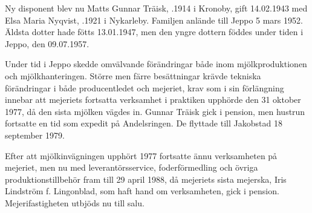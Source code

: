 Ny disponent blev nu Matts Gunnar Träisk, .1914 i Kronoby, gift 14.02.1943 med Elsa Maria Nyqvist, .1921 i Nykarleby. Familjen anlände till Jeppo 5 mars 1952. Äldsta dotter  hade fötts 13.01.1947, men den yngre dottern  föddes under tiden i Jeppo, den 09.07.1957.

Under  tid i Jeppo skedde omvälvande förändringar både inom mjölkproduktionen och mjölkhanteringen. Större men färre besättningar krävde tekniska förändringar i både producentledet och mejeriet, krav som i sin förlängning innebar att mejeriets fortsatta verksamhet i praktiken upphörde den 31 oktober 1977, då den sista mjölken vägdes in. Gunnar Träisk gick i pension, men hustrun  fortsatte en tid som expedit på Andelsringen. De flyttade till Jakobstad 18 september 1979.


Efter att mjölkinvägningen upphört 1977 fortsatte ännu verksamheten på mejeriet, men nu med leverantörsservice, foderförmedling och övriga produktionstillbehör fram till 29 april 1988, då mejeriets sista mejerska, Iris Lindström f. Lingonblad, som haft hand om verksamheten, gick i pension. Mejerifastigheten utbjöds nu till salu.


